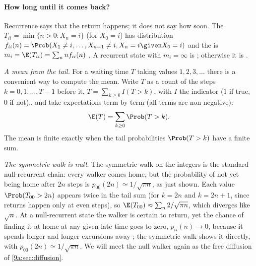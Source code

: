 \paragraph{How long until it comes back?}
Recurrence says that the return happens; it does not say how soon. The  $T_{ii}=\min\{n>0:X_n=i\}$ (for $X_0=i$) has distribution
$f_{ii}(n)=\Prob(X_1\ne i,\dots,X_{n-1}\ne i,X_n=i\given X_0=i)$ and the  is $m_i=\E(T_{ii})=\sum_nnf_{ii}(n)$ . A recurrent state with
$m_i=\infty$ is ; otherwise it is .

\emph{A mean from the tail.} For a waiting time $T$ taking values $1,2,3,\dots$ there is a
convenient way to compute the mean. Write $T$ as a count of the steps $k=0,1,\dots,T-1$ before
it, $T=\sum_{k\ge0}I(T>k)$, with $I$ the indicator ($1$ if true, $0$ if not),, and take expectations term by term (all terms are
non-negative):
\begin{equation*}
  \E(T)=\sum_{k\ge0}\Prob(T>k).
\end{equation*}
The mean is finite exactly when the tail probabilities $\Prob(T>k)$ have a finite sum.

\emph{The symmetric walk is null.} The symmetric walk on the integers is the standard
null-recurrent chain: every walker comes home, but the probability of not yet being home after
$2n$ steps is $p_{00}(2n)\simeq1/\sqrt{\pi n}$, as just shown. Each value $\Prob(T_{00}>2n)$
appears twice in the tail sum (for $k=2n$ and $k=2n+1$, since returns happen only at even
steps), so $\E(T_{00})\approx\sum_n2/\sqrt{\pi n}$, which diverges like $\sqrt n$. At a
null-recurrent state the walker is certain to return, yet the chance of finding it at home at
any given late time goes to zero, $p_{ii}(n)\to0$, because it spends longer and longer
excursions away ; the symmetric walk shows it directly, with
$p_{00}(2n)\simeq1/\sqrt{\pi n}$. We will meet the null walker again as the free diffusion of
\cref{9a:sec:diffusion}.


